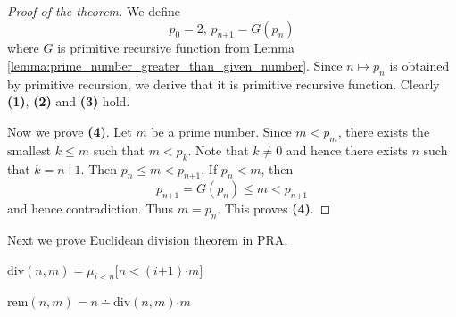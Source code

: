 \documentclass[10pt]{amsart}
\newcommand{\mle}{\boldsymbol{<}}
\newcommand{\mleq}{\boldsymbol{\leq}}
\newcommand{\meq}{\boldsymbol{=}}
\newcommand{\mneq}{\boldsymbol{\neq}}
\newcommand{\mplus}{\boldsymbol{+}}
\newcommand{\mdot}{\boldsymbol{\cdot}}
\begin{document}
\begin{proof}[Proof of the theorem]
	We define
	$$p_0 \meq 2,\,p_{n\mplus1} \meq G(p_n)$$
	where $G$ is primitive recursive function from Lemma \ref{lemma:prime_number_greater_than_given_number}. Since $n\mapsto p_n$ is obtained by primitive recursion, we derive that it is primitive recursive function. Clearly \textbf{(1)}, \textbf{(2)} and \textbf{(3)} hold.

	Now we prove \textbf{(4)}. Let $m$ be a prime number. Since $m \mle p_m$, there exists the smallest $k \mleq m$ such that $m \mle p_k$. Note that $k \mneq 0$ and hence there exists $n$ such that $k \meq n \mplus 1$. Then $p_n \mleq m \mle p_{n\mplus1}$. If $p_n \mle m$, then
	$$p_{n\mplus1} \meq G(p_n) \mleq m \mle p_{n\mplus1}$$
	and hence contradiction. Thus $m \meq p_n$. This proves \textbf{(4)}.
\end{proof}
\noindent
Next we prove Euclidean division theorem in $\mathrm{PRA}$.

\begin{definition}
	$\mathrm{div}(n,m) \meq \mu_{i \mle n}\big[n \mle (i \mplus 1)\mdot m\big]$
\end{definition}

\begin{definition}
	$\mathrm{rem}(n,m) \meq n \dotminus \mathrm{div}(n,m)\mdot m$
\end{definition}
\end{document}
